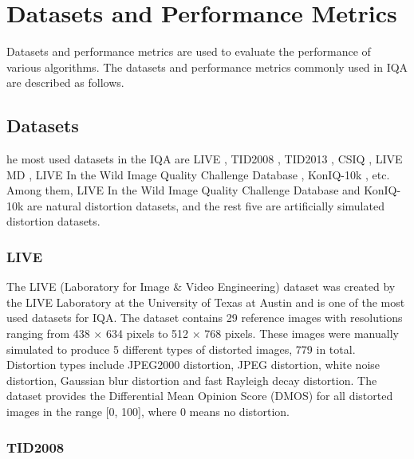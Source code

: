 \documentclass{article}
\begin{document}

\section{Datasets and Performance Metrics}
\label{Datasets and Performance Metrics}

Datasets and performance metrics are used to evaluate the performance of various algorithms. The datasets and performance metrics commonly used in IQA are described as follows.

\subsection{Datasets}
\label{Datasets}

he most used datasets in the IQA are LIVE \cite{sheikh2006statistical}, TID2008 \cite{ponomarenko2009tid2008}, TID2013 \cite{ponomarenko2013color}, CSIQ \cite{larson2010most}, LIVE MD \cite{jayaraman2012objective}, LIVE In the Wild Image Quality Challenge Database \cite{ghadiyaram2015massive}, KonIQ-10k \cite{lin2018koniq}, etc. Among them, LIVE In the Wild Image Quality Challenge Database and KonIQ-10k are natural distortion datasets, and the rest five are artificially simulated distortion datasets.


\subsubsection{LIVE}
\label{LIVE}

The LIVE (Laboratory for Image \& Video Engineering) dataset  \cite{sheikh2006statistical} was created by the LIVE Laboratory at the University of Texas at Austin and is one of the most used datasets for IQA. The dataset contains 29 reference images with resolutions ranging from 438 × 634 pixels to 512 × 768 pixels. These images were manually simulated to produce 5 different types of distorted images, 779 in total. Distortion types include JPEG2000 distortion, JPEG distortion, white noise distortion, Gaussian blur distortion and fast Rayleigh decay distortion. The dataset provides the Differential Mean Opinion Score (DMOS) for all distorted images in the range [0, 100], where 0 means no distortion.

\subsubsection{TID2008}
\label{TID2008}
\end{document}
